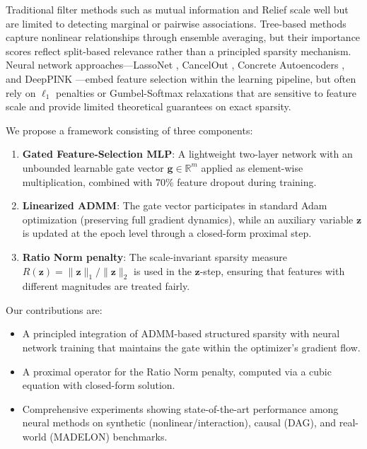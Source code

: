 \documentclass{uai2026} %
\theoremstyle{definition}
\theoremstyle{remark}
\newcommand{\bz}{\mathbf{z}}
\newcommand{\bg}{\mathbf{g}}
\begin{document}
Traditional filter methods such as mutual information \citep{peng2005mrmr} and Relief \citep{kira1992relief} scale well but are limited to detecting marginal or pairwise associations.
Tree-based methods \citep{breiman2001random, lundberg2017shap} capture nonlinear relationships through ensemble averaging, but their importance scores reflect split-based relevance rather than a principled sparsity mechanism.
Neural network approaches---LassoNet \citep{lemhadri2021lassonet}, CancelOut \citep{borisov2019cancelout}, Concrete Autoencoders \citep{balin2019concrete}, and DeepPINK \citep{lu2018deeppink}---embed feature selection within the learning pipeline, but often rely on $\ell_1$ penalties or Gumbel-Softmax relaxations that are sensitive to feature scale and provide limited theoretical guarantees on exact sparsity.

We propose a framework consisting of three components:
\begin{enumerate}
    \item \textbf{Gated Feature-Selection MLP}: A lightweight two-layer network with an unbounded learnable gate vector $\bg \in \mathbb{R}^m$ applied as element-wise multiplication, combined with 70\% feature dropout during training.
    \item \textbf{Linearized ADMM}: The gate vector participates in standard Adam optimization (preserving full gradient dynamics), while an auxiliary variable $\bz$ is updated at the epoch level through a closed-form proximal step.
    \item \textbf{Ratio Norm penalty}: The scale-invariant sparsity measure $R(\bz) = \lVert\bz\rVert_1 / \lVert\bz\rVert_2$ is used in the $\bz$-step, ensuring that features with different magnitudes are treated fairly.
\end{enumerate}

Our contributions are:
\begin{itemize}
    \item A principled integration of ADMM-based structured sparsity with neural network training that maintains the gate within the optimizer's gradient flow.
    \item A proximal operator for the Ratio Norm penalty, computed via a cubic equation with closed-form solution.
    \item Comprehensive experiments showing state-of-the-art performance among neural methods on synthetic (nonlinear/interaction), causal (DAG), and real-world (MADELON) benchmarks.
\end{itemize}
\end{document}
